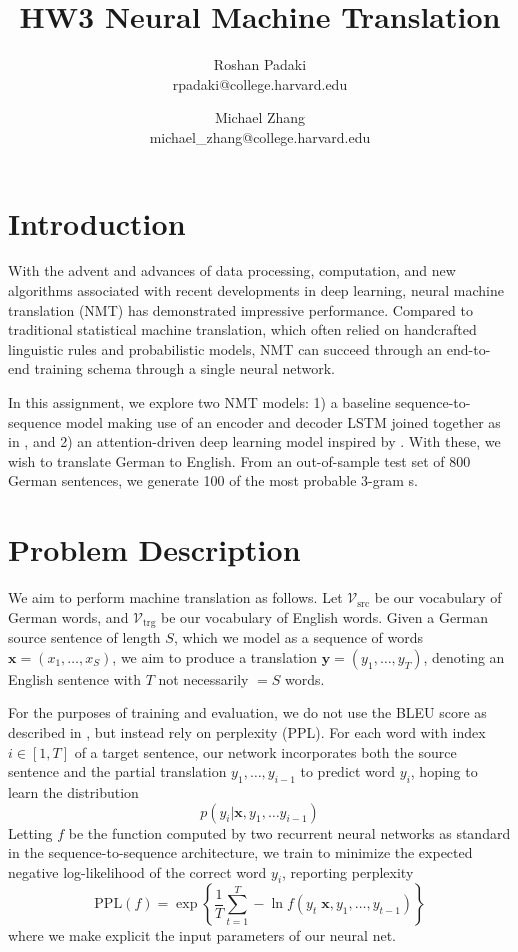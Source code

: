 \documentclass[11pt]{article}
\title{HW3 Neural Machine Translation}
\author{Roshan Padaki \\ rpadaki@college.harvard.edu \and Michael Zhang \\ michael\_zhang@college.harvard.edu }
\begin{document}
\maketitle{}
\section{Introduction}

With the advent and advances of data processing, computation, and new algorithms associated with recent developments in deep learning, neural machine translation (NMT) has demonstrated impressive performance. Compared to traditional statistical machine translation, which often relied on handcrafted linguistic rules and probabilistic models, NMT can succeed through an end-to-end training schema through a single neural network.

In this assignment, we explore two NMT models: 1) a baseline sequence-to-sequence model making use of an encoder and decoder LSTM joined together as in \cite{43155}, and 2) an attention-driven deep learning model inspired by \cite{DBLP:journals/corr/BahdanauCB14}. With these, we wish to translate German to English. From an out-of-sample test set of 800 German sentences, we generate 100 of the most probable 3-gram s.

\section{Problem Description}
We aim to perform machine translation as follows. Let $\mathcal{V}_\text{src}$ be our vocabulary of German words, and $\mathcal{V}_\text{trg}$ be our vocabulary of English words. Given a German source sentence of length $S$, which we model as a sequence of words $\mathbf{x} = (x_1, \ldots, x_S)$, we aim to produce a translation $\mathbf{y} = (y_1, \ldots, y_T)$, denoting an English sentence with $T$ not necessarily $= S$ words. 

For the purposes of training and evaluation, we do not use the BLEU score as described in \cite{P02-1040}, but instead rely on perplexity (PPL). For each word with index $i \in [1, T]$ of a target sentence, our network incorporates both the source sentence and the partial translation $y_1, \ldots, y_{i-1}$ to predict word $y_i$, hoping to learn the distribution
\[
p(y_i | \mathbf{x}, y_1, \ldots y_{i-1})
\]
Letting $f$ be the function computed by two recurrent neural networks as standard in the sequence-to-sequence architecture, we train to minimize the expected negative log-likelihood of the correct word $y_i$, reporting perplexity
\[
\text{PPL}(f) = \exp \left\{\frac{1}{T}\sum_{t=1}^T - \ln f(y_t\; \mathbf{x}, y_1, \ldots, y_{t-1}) \right\}
\]
where we make explicit the input parameters of our neural net.
\end{document}
